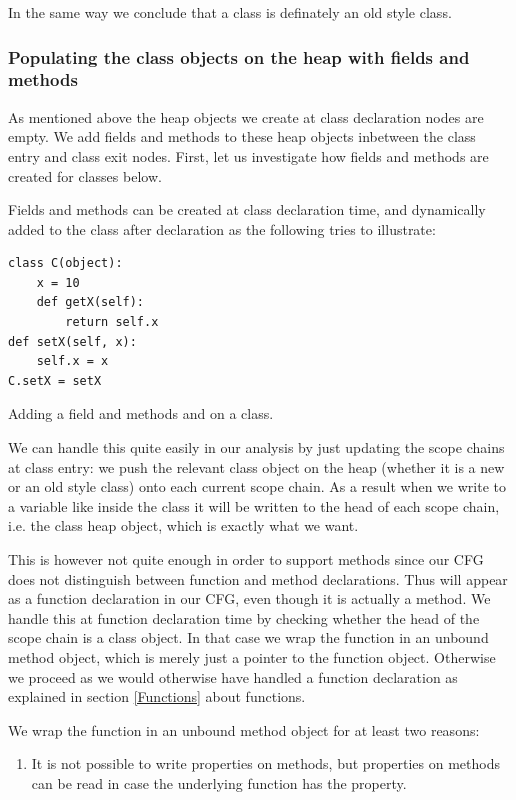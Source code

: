 In the same way we conclude that a class is definately an old style class.

\subsubsection{Populating the class objects on the heap with fields and methods}
As mentioned above the heap objects we create at class declaration nodes are empty. We add fields and methods to these heap objects inbetween the class entry and class exit nodes. First, let us investigate how fields and methods are created for classes below.

Fields and methods can be created at class declaration time, and dynamically added to the class after declaration as the following tries to illustrate:

\begin{listing}[H]
	\begin{verbatim}
class C(object):
	x = 10
	def getX(self):
		return self.x
def setX(self, x):
	self.x = x
C.setX = setX
	\end{verbatim}
	\caption{Adding a field  and methods  and  on a class.}\label{code:FieldAndMethodOnClass}
\end{listing}

We can handle this quite easily in our analysis by just updating the scope chains at class entry: we push the relevant class object on the heap (whether it is a new or an old style class) onto each current scope chain. As a result when we write to a variable like  inside the class it will be written to the head of each scope chain, i.e. the class heap object, which is exactly what we want.

This is however not quite enough in order to support methods since our CFG does not distinguish between function and method declarations. Thus  will appear as a function declaration in our CFG, even though it is actually a method. We handle this at function declaration time by checking whether the head of the scope chain is a class object. In that case we wrap the function in an unbound method object, which is merely just a pointer to the function object. Otherwise we proceed as we would otherwise have handled a function declaration as explained in section \ref{Functions} about functions.

We wrap the function in an unbound method object for at least two reasons:

\begin{enumerate}
	\item It is not possible to write properties on methods, but properties on methods can be read in case the underlying function has the property.
\end{enumerate}


